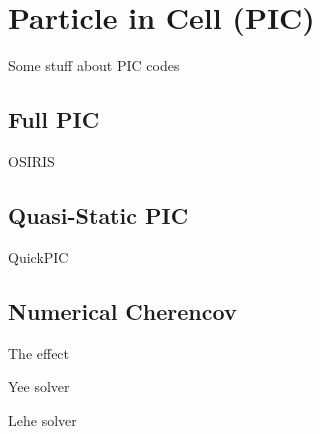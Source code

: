 %
%

\chapter{Particle in Cell (PIC)}
\label{Apx:PIC}

Some stuff about PIC codes

\section{Full PIC}
\label{PIC:Full}
OSIRIS \cite{fonseca:2002, add:fonseca:2017}


\section{Quasi-Static PIC}
\label{PIC:QS}
QuickPIC \cite{an:2013, huang:2006}


\section{Numerical Cherencov}
\label{PIC:NumCher}

The effect \cite{godfrey:1974, greenwood:2004}

Yee solver \cite{yee:1966}

Lehe solver \cite{lehe:2013}
